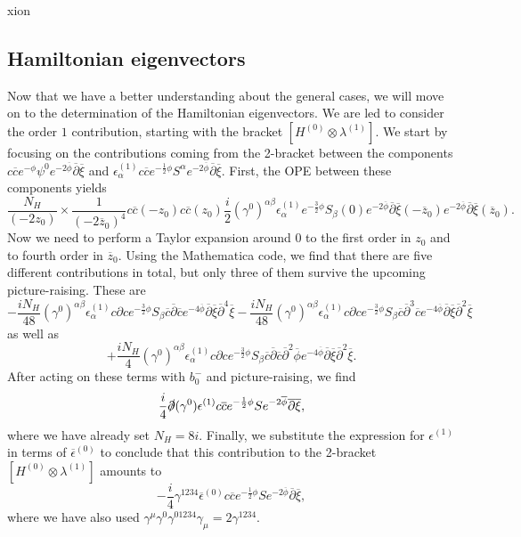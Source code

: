 xion\documentclass[12pt]{article}
\def\be{\begin{equation}}
\def\ee{\end{equation}}
\numberwithin{equation}{section}
\newcommand{\B}[1]{\overline{#1}}
\begin{document}
\subsection{Hamiltonian eigenvectors}
Now that we have a better understanding about the general cases, we will move on to the determination of the Hamiltonian eigenvectors. We are led to consider the order $1$ contribution, starting with the bracket $[H^{(0)}\otimes\lambda^{(1)}]$. We start by focusing on the contributions coming from the 2-bracket between the components $c\B{c}e^{-\phi}\psi^{0}e^{-2\B{\phi}}\B{\partial}\B{\xi}$ and $\epsilon^{(1)}_{\alpha}c\B{c}e^{-\frac{1}{2}\phi}S^{\alpha}e^{-2\B{\phi}}\B{\partial}\B{\xi}$. First, the OPE between these components yields
\be
	\frac{N_{H}}{(-2z_{0})}\times\frac{1}{(-2\B{z}_{0})^{4}}c\B{c}(-z_{0})c\B{c}(z_{0})\frac{i}{2}(\gamma^{0})^{\alpha\beta}\epsilon_{\alpha}^{(1)}e^{-\frac{3}{2}\phi}S_{\beta}(0)e^{-2\B{\phi}}\B{\partial}\B{\xi}(-\B{z}_{0})e^{-2\B{\phi}}\B{\partial}\B{\xi}(\B{z}_{0}).
\ee
Now we need to perform a Taylor expansion around $0$ to the first order in $z_{0}$ and to fourth order in $\B{z}_{0}$. Using the Mathematica code, we find that there are five different contributions in total, but only three of them survive the upcoming picture-raising. These are
\be
	-\frac{iN_{H}}{48}(\gamma^{0})^{\alpha\beta}\epsilon_{\alpha}^{(1)}c\partial ce^{-\frac{3}{2}\phi}S_{\beta}\B{c}\B{\partial}\B{c}e^{-4\B{\phi}}\B{\partial}\B{\xi}\B{\partial}^{4}\B{\xi}-\frac{iN_{H}}{48}(\gamma^{0})^{\alpha\beta}\epsilon_{\alpha}^{(1)}c\partial ce^{-\frac{3}{2}\phi}S_{\beta}\B{c}\B{\partial}^{3}\B{c}e^{-4\B{\phi}}\B{\partial}\B{\xi}\B{\partial}^{2}\B{\xi}
\ee
as well as
\be
	+\frac{iN_{H}}{4}(\gamma^{0})^{\alpha\beta}\epsilon_{\alpha}^{(1)}c\partial ce^{-\frac{3}{2}\phi}S_{\beta}\B{c}\B{\partial}\B{c}\B{\partial}^{2}\B{\phi} e^{-4\B{\phi}}\B{\partial}\B{\xi}\B{\partial}^{2}\B{\xi}.
\ee
After acting on these terms with $b_{0}^{-}$ and picture-raising, we find
\be
	\frac{i}{4}\slashed{\partial}(\gamma^{0})\epsilon^{(1)}c\B{c}e^{-\frac{1}{2}\phi}Se^{-2\B{\phi}}\B{\partial}\B{\xi},
\ee
where we have already set $N_{H}=8i$. Finally, we substitute the expression for $\epsilon^{(1)}$ in terms of $\B{\epsilon}^{(0)}$ to conclude that this contribution to the 2-bracket $[H^{(0)}\otimes\lambda^{(1)}]$ amounts to
\be
	-\frac{i}{4}\gamma^{1234}\B{\epsilon}^{(0)}c\B{c}e^{-\frac{1}{2}\phi}Se^{-2\B{\phi}}\B{\partial}\B{\xi},
\ee
where we have also used $\gamma^{\mu}\gamma^{0}\gamma^{01234}\gamma_{\mu}=2\gamma^{1234}$.
\end{document}
